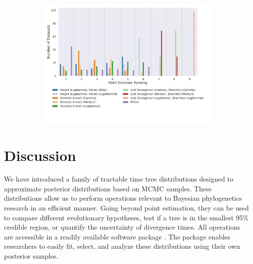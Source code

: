 \documentclass[10pt,letterpaper]{article}
\begin{document}
\begin{figure}
	\begin{subfigure}[b]{0.45\textwidth}
		\centering
		\includegraphics[width=\textwidth]{figures/yule-400-ccd1-point-estimates-ranking.png}
	\end{subfigure}
	
	\label{fig:accuracy-point-estimators-ranking}
\end{figure}

\section*{Discussion}

We have introduced a family of tractable time tree distributions designed to approximate posterior distributions based on MCMC samples. These distributions allow us to perform operations relevant to Bayesian phylogenetics research in an efficient manner. Going beyond point estimation, they can be used to compare different evolutionary hypotheses, test if a tree is in the smallest 95\% credible region, or quantify the uncertainty of divergence times. All operations are accessible in a readily available software package \cite{juliapackage}. The package enables researchers to easily fit, select, and analyze these distributions using their own posterior samples.
\end{document}
